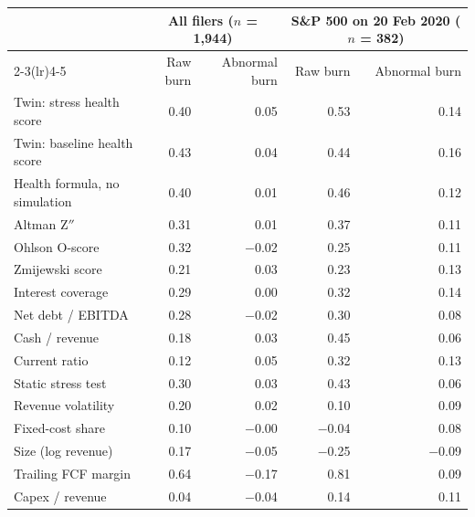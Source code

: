 \begin{tabular}{lrrrr}
\toprule
 & \multicolumn{2}{c}{All filers ($n$ = 1{,}944)} & \multicolumn{2}{c}{S\&P 500 on 20 Feb 2020 ($n$ = 382)} \\
\cmidrule(lr){2-3}\cmidrule(lr){4-5}
 & Raw burn & Abnormal burn & Raw burn & Abnormal burn \\
\midrule
Twin: stress health score & 0.40 & 0.05 & 0.53 & 0.14 \\
Twin: baseline health score & 0.43 & 0.04 & 0.44 & 0.16 \\
Health formula, no simulation & 0.40 & 0.01 & 0.46 & 0.12 \\
\addlinespace
Altman Z$''$ & 0.31 & 0.01 & 0.37 & 0.11 \\
Ohlson O-score & 0.32 & $-$0.02 & 0.25 & 0.11 \\
Zmijewski score & 0.21 & 0.03 & 0.23 & 0.13 \\
Interest coverage & 0.29 & 0.00 & 0.32 & 0.14 \\
Net debt / EBITDA & 0.28 & $-$0.02 & 0.30 & 0.08 \\
Cash / revenue & 0.18 & 0.03 & 0.45 & 0.06 \\
Current ratio & 0.12 & 0.05 & 0.32 & 0.13 \\
Static stress test & 0.30 & 0.03 & 0.43 & 0.06 \\
Revenue volatility & 0.20 & 0.02 & 0.10 & 0.09 \\
Fixed-cost share & 0.10 & $-$0.00 & $-$0.04 & 0.08 \\
Size (log revenue) & 0.17 & $-$0.05 & $-$0.25 & $-$0.09 \\
\addlinespace
Trailing FCF margin & 0.64 & $-$0.17 & 0.81 & 0.09 \\
Capex / revenue & 0.04 & $-$0.04 & 0.14 & 0.11 \\
\bottomrule
\end{tabular}
